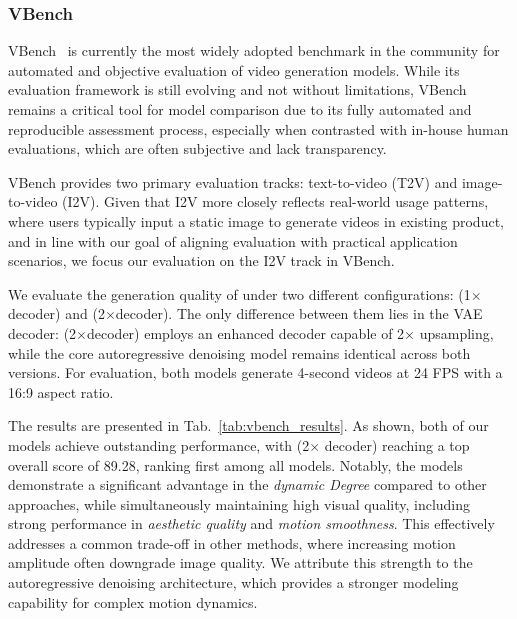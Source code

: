 \subsubsection{VBench}
\label{subsubsec:i2v_public_evaluation} 




VBench~\citep{huang2024vbenchcomprehensiveversatilebenchmark} is currently the most widely adopted benchmark in the community for automated and objective evaluation of video generation models. While its evaluation framework is still evolving and not without limitations, VBench remains a critical tool for model comparison due to its fully automated and reproducible assessment process, especially when contrasted with in-house human evaluations, which are often subjective and lack transparency.

VBench provides two primary evaluation tracks: text-to-video (T2V) and image-to-video (I2V). Given that I2V more closely reflects real-world usage patterns, where users typically input a static image to generate videos in existing product, and in line with our goal of aligning evaluation with practical application scenarios, we focus our evaluation on the I2V track in VBench.

We evaluate the generation quality of \magi under two different configurations: \magi (1$\times$decoder) and \magi (2$\times$decoder). The only difference between them lies in the VAE decoder: \magi (2$\times$decoder) employs an enhanced decoder capable of 2× upsampling, while the core autoregressive denoising model remains identical across both versions. For evaluation, both models generate 4-second videos at 24 FPS with a 16:9 aspect ratio.



The results are presented in Tab.~\ref{tab:vbench_results}. As shown, both of our models achieve outstanding performance, with \magi (2$\times$ decoder) reaching a top overall score of 89.28, ranking first among all models.
Notably, the \magi models demonstrate a significant advantage in the \emph{dynamic Degree} compared to other approaches, while simultaneously maintaining high visual quality, including strong performance in \emph{aesthetic quality} and \emph{motion smoothness}. This effectively addresses a common trade-off in other methods, where increasing motion amplitude often downgrade image quality. We attribute this strength to the autoregressive denoising architecture, which provides a stronger modeling capability for complex motion dynamics.




